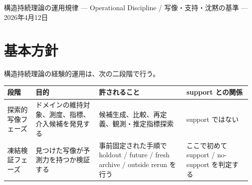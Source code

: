 \documentclass[12pt,a4paper]{article}
\begin{document}
\PaperTitleBlock
  {構造持続理論の運用規律}
  {— Operational Discipline / 写像・支持・沈黙の基準 —}
  {2026年4月12日}

\begin{abstract}
本補論は、構造持続理論を現実ドメインへ適用するときの運用規律をまとめる。中心にあるのは、理論核と写像発見を分けることである。理論核は、事前固定された構造維持問題に対する会計的・代数的制約である。一方、現実ドメインでは、維持対象、構造粒度、測度、構造消耗指標、回復指標を探索的に発見する段階がある。この探索は許される。しかし、その同じ探索データ上の説明を support と呼んではならない。

Support と呼べるのは、写像・特徴量・baseline・metric・split・実行手順を凍結した後、holdout / future / fresh archive / outside rerun で、事前に定めた基準を満たした場合に限る。この補論は、その判定語彙を明示する。
\end{abstract}

\section{基本方針}\label{ux57faux672cux65b9ux91dd}

構造持続理論の経験的運用は、次の二段階で行う。

{\def\LTcaptype{table} %
\begin{longtable}[]{@{}
  >{\raggedright\arraybackslash}p{}
  >{\raggedright\arraybackslash}p{}
  >{\raggedright\arraybackslash}p{}
  >{\raggedright\arraybackslash}p{}@{}}
\toprule\noalign{}
\begin{minipage}[b]{\linewidth}\raggedright
段階
\end{minipage} & \begin{minipage}[b]{\linewidth}\raggedright
目的
\end{minipage} & \begin{minipage}[b]{\linewidth}\raggedright
許されること
\end{minipage} & \begin{minipage}[b]{\linewidth}\raggedright
support との関係
\end{minipage} \\
\midrule\noalign{}
\endhead
\bottomrule\noalign{}
\endlastfoot
探索的写像フェーズ & ドメインの維持対象、測度、指標、介入候補を発見する & 候補生成、比較、再定義、観測・推定指標探索 & support ではない \\
凍結検証フェーズ & 見つけた写像が予測力を持つか検証する & 事前固定された手順で holdout / future / fresh archive / outside rerun を行う & ここで初めて support / no-support を判定する \\
\end{longtable}
}
\end{document}
